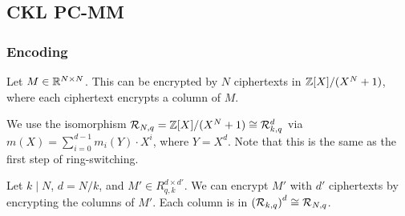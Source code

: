 \documentclass[../fheimpl.tex]{subfiles}
\begin{document}
\subsection{CKL PC-MM}

\subsubsection{Encoding}
Let $M\in\R^{N\times N}$. This can be encrypted by $N$ ciphertexts in $\Z[X]/(X^N+1)$, where each ciphertext encrypts a column of $M$.

We use the isomorphism $\mathcal{R}_{N,q}=\Z[X]/(X^N+1) \cong \mathcal{R}_{k,q}^d$ via $m(X)=\sum_{i=0}^{d-1} m_i(Y)\cdot X^i$, where $Y=X^d$. Note that this is the same as the first step of ring-switching.

Let $k \mid N$, $d=N/k$, and $M'\in R^{d\times d'}_{q, k}$. We can encrypt $M'$ with $d'$ ciphertexts by encrypting the columns of $M'$. Each column is in $\parens*{\mathcal{R}_{k,q}}^d\cong \mathcal{R}_{N,q}$.


%
%
%

    \ifcompileasbook
    \else
    \printbibliography
    \fi
	
\end{document}
